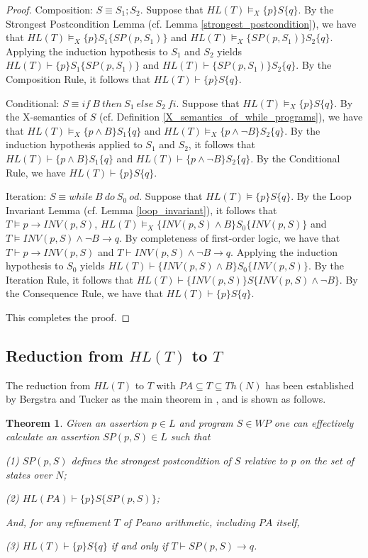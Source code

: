 \documentclass[a4paper,11pt]{article}
\begin{document}
\begin{proof}
Composition: $S \equiv S_1;S_2$. Suppose that $HL(T)\models_X \{p\} S \{q\}$. By the Strongest Postcondition Lemma (cf. Lemma \ref{strongest_postcondition}), we have that $HL(T) \models_X \{p\} S_1 \{SP(p,S_1)\}$ and $HL(T) \models_X  \{SP(p,S_1)\} S_2 \{q\}$. Applying the induction hypothesis to $S_1$ and $S_2$ yields $HL(T) \vdash \{p\} S_1 \{SP(p,S_1)\}$ and $HL(T) \vdash  \{SP(p,S_1)\} S_2 \{q\}$. By the Composition Rule, it follows that $HL(T) \vdash \{p\} S \{q\}$.

Conditional: $S \equiv if\ B\ then\ S_1\ else\ S_2\ fi$. Suppose that $HL(T)\models_X \{p\} S \{q\}$. By the X-semantics of $S$ (cf. Definition \ref{X_semantics_of_while_programs}), we have that $HL(T) \models_X \{p \wedge B\} S_1 \{q\}$ and $HL(T) \models_X \{p \wedge \neg B\} S_2 \{q\}$. By the induction hypothesis applied to $S_1$ and $S_2$, it follows that $HL(T) \vdash \{p \wedge B\} S_1 \{q\}$ and $HL(T) \vdash \{p \wedge \neg B\} S_2 \{q\}$. By the Conditional Rule, we have $HL(T) \vdash \{p\} S \{q\}$.

Iteration: $S \equiv while\ B\ do\ S_0\ od$. Suppose that $HL(T)\models \{p\} S \{q\}$. By the Loop Invariant Lemma (cf. Lemma \ref{loop_invariant}), it follows that $T \models p \rightarrow INV(p,S)$, $HL(T) \models_X \{ INV(p,S) \wedge B \} S_0 \{ INV(p,S)\}$ and $T\models INV(p,S) \wedge \neg B \rightarrow q$. By completeness of first-order logic, we have that $T \vdash p \rightarrow INV(p,S)$ and $T \vdash INV(p,S) \wedge \neg B \rightarrow q$. Applying the induction hypothesis to $S_0$ yields $HL(T) \vdash \{ INV(p,S) \wedge B \} S_0 \{ INV(p,S)\}$. By the Iteration Rule, it follows that $HL(T) \vdash \{ INV(p,S) \} S \{ INV(p,S) \wedge \neg B \}$. By the Consequence Rule, we have that $HL(T) \vdash \{p\} S \{q\}$.

This completes the proof.
\end{proof}

\subsection{Reduction from $HL(T)$ to $T$}\label{section_of_from_hl_to_pa}

The reduction from $HL(T)$ to $T$ with $PA\subseteq T \subseteq Th(N)$ has been established by Bergstra and Tucker as the main theorem in \cite{bergstra_2}, and is shown as follows.

\newtheorem{bergstra_theorem}{Theorem}[subsection]
\begin{bergstra_theorem}\label{bergstra_theorem}
Given an assertion $p\in L$ and program $S\in WP$ one can effectively calculate
an assertion $SP(p,S)\in L$ such that

(1) $SP(p,S)$ defines the strongest postcondition of $S$ relative to $p$ on the set of states
over $N$;

(2) $HL(PA)\vdash \{p\}S\{SP(p,S)\}$;

\noindent And, for any refinement $T$ of Peano arithmetic, including $PA$ itself,

(3) $HL(T)\vdash \{p\}S\{q\}$ if and only if $T\vdash SP(p,S)\rightarrow q$.
\end{bergstra_theorem}
\end{document}
